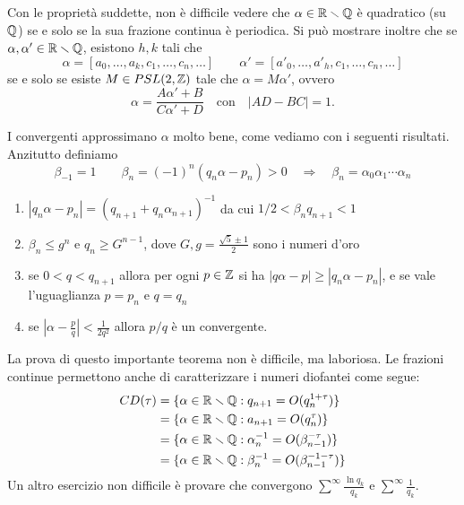 \begin{esempio}
 Con le propriet\`a suddette, non \`e difficile vedere che $\alpha\in\irr$ \`e quadratico (su $\mathbb{Q}$) se e solo se la sua frazione continua  \`e periodica. 
 Si pu\`o mostrare inoltre che se $\alpha,\alpha'\in\mathbb{R}\smallsetminus\mathbb{Q}$, esistono $h,k$ tali che
 \[\alpha=[a_0,\dots,a_k,c_1,\dots,c_n,\dots] \qquad \alpha'=[a'_0,\dots,a'_h,c_1,\dots,c_n,\dots]\]
 se e solo se esiste $M\in PSL(2,\mathbb{Z})$ tale che $\alpha=M\alpha'$, ovvero 
 \[\alpha=\frac{A\alpha'+B}{C\alpha'+D}\quad \mbox{con}\quad |AD-BC|=1.\]
\end{esempio}

I convergenti approssimano $\alpha$ molto bene, come vediamo con i seguenti risultati. Anzitutto definiamo
\[\beta_{-1}=1\qquad \beta_n=(-1)^n(q_n\alpha-p_n)>0 \quad \Rightarrow \quad \beta_n=\alpha_0\alpha_1\cdots \alpha_n\]

\begin{teo}\begin{enumerate} Se $\alpha\in\irr$, valgono
  \item $|q_n\alpha-p_n|=(q_{n+1}+q_n\alpha_{n+1})^{-1}$ da cui $1/2<\beta_nq_{n+1}<1$
  \item $\beta_n\leq g^n$ e $q_n\geq G^{n-1}$, dove $G,g=\frac{\sqrt 5\pm 1}{2}$ sono i numeri d'oro
  \item se $0<q<q_{n+1}$ allora per ogni $p\in\mathbb{Z}$ si ha $|q\alpha-p|\geq |q_n\alpha-p_n|$, e se vale l'uguaglianza $p=p_n$ e $q=q_n$
  \item se $\left|\alpha-\frac{p}{q}\right|<\frac{1}{2q^2}$ allora $p/q$  \`e un convergente.
  \end{enumerate}\end{teo}

La prova di questo importante teorema non  \`e difficile, ma laboriosa. Le frazioni continue permettono anche di caratterizzare i numeri diofantei come segue:
\[\begin{split} CD(\tau)&=\{\alpha\in\mathbb{R}\smallsetminus\mathbb{Q}:q_{n+1}=O(q_n^{1+\tau})\}\\
			&=\{\alpha\in\mathbb{R}\smallsetminus\mathbb{Q}:a_{n+1}=O(q_n^{\tau})\}\\
			&=\{\alpha\in\mathbb{R}\smallsetminus\mathbb{Q}:\alpha_n^{-1}=O(\beta_{n-1}^{-\tau})\}\\
			&=\{\alpha\in\mathbb{R}\smallsetminus\mathbb{Q}:\beta_n^{-1}=O(\beta_{n-1}^{-1-\tau})\}
\end{split}\]
Un altro esercizio non difficile  \`e provare che convergono $\sum^\infty\frac{\ln q_k}{q_k}$ e $\sum^\infty\frac{1}{q_k}$.



